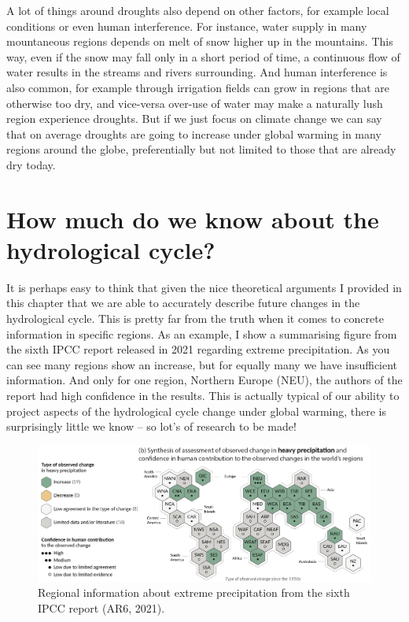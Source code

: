 \documentclass[12pt]{book}
\begin{document}
A lot of things around droughts also depend on other factors, for example local conditions or even human interference. For instance, water supply in many mountaneous regions depends on melt of snow higher up in the mountains. This way, even if the snow may fall only in a short period of time, a continuous flow of water results in the streams and rivers surrounding. And human interference is also common, for example through irrigation fields can grow in regions that are otherwise too dry, and vice-versa over-use of water may make a naturally lush region experience droughts. But if we just focus on climate change we can say that on average droughts are going to increase under global warming in many regions around the globe, preferentially but not limited to those that are already dry today. 


\section{How much do we know about the hydrological cycle?}
It is perhaps easy to think that given the nice theoretical arguments I provided in this chapter that we are able to accurately describe future changes in the hydrological cycle. This is pretty far from the truth when it comes to concrete information in specific regions. As an example, I show a summarising figure from the sixth IPCC report released in 2021 regarding extreme precipitation. As you can see many regions show an increase, but for equally many we have insufficient information. And only for one region, Northern Europe (NEU), the authors of the report had high confidence in the results. This is actually typical of our ability to project aspects of the hydrological cycle change under global warming, there is surprisingly little we know -- so lot's of research to be made!

\begin{figure}
\begin{center}
\includegraphics[width=15 cm]{../external_figures/AR6_heavy_precipitation}
\end{center}
\caption{ Regional information about extreme precipitation from the sixth IPCC report (AR6, 2021). } 
\label{fig:extreme_precipitation_AR6}
\end{figure}
\end{document}
